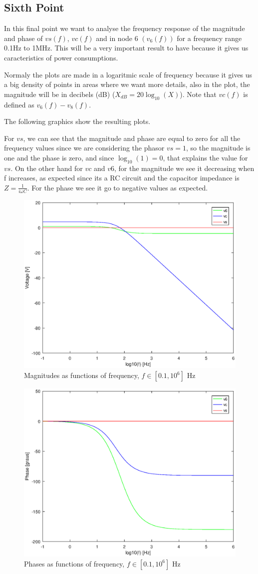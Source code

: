 \subsection{Sixth Point}
\label{ssec:6T}

\par In this final point we want to analyse the frequency response of the magnitude and phase of $vs(f)$, $vc(f)$ and in node 6 $(v_6(f))$ for a frequency range 0.1Hz to 1MHz. This will be a very important result to have because it gives us caracteristics of power consumptions.
\par Normaly the plots are made in a logaritmic scale of frequency because it gives us a big density of points in areas where we want more details, also in the plot, the magnitude will be in decibels (dB) ($X_{dB}=20\log _{10}(X)$). Note that $vc(f)$ is defined as $v_6(f)-v_8(f)$.
\par The following graphics show the resulting plots.
\par For $vs$, we can see that the magnitude and phase are equal to zero for all the frequency values since we are considering the phasor $vs=1$, so the magnitude is one and the phase is zero, and since $\log _{10}(1)=0$, that explains the value for $vs$. On the other hand for $vc$ and $v6$, for the magnitude we see it decreasing when f increases, as expected since its a RC circuit and the capacitor impedance is $Z=\frac{1}{i \omega C}$. For the phase we see it go to negative values as expected. 

\begin{figure}[h!] \centering
\includegraphics[width=0.6\linewidth]{magnitude(freq).eps}
\caption{Magnitudes as functions of frequency, $f\in[0.1,10^6]$ Hz}
\label{fig:mag(f)}
\end{figure}

\begin{figure}[h!] \centering
\includegraphics[width=0.6\linewidth]{phase(freq).eps}
\caption{Phases as functions of frequency, $f\in[0.1,10^6]$ Hz}
\label{fig:pha(f)}
\end{figure}
\newpage

